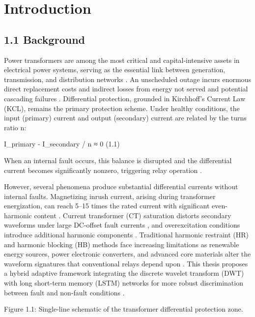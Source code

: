 \chapter{Introduction}
\label{ch:introduction}


\section{1.1  Background}
Power transformers are among the most critical and capital-intensive assets in electrical power systems, serving as the essential link between generation, transmission, and distribution networks \cite{ref1}. An unscheduled outage incurs enormous direct replacement costs and indirect losses from energy not served and potential cascading failures \cite{ref2}. Differential protection, grounded in Kirchhoff's Current Law (KCL), remains the primary protection scheme. Under healthy conditions, the input (primary) current and output (secondary) current are related by the turns ratio n:

I\_primary - I\_secondary / n ≈ 0	(1.1)

When an internal fault occurs, this balance is disrupted and the differential current becomes significantly nonzero, triggering relay operation \cite{ref3}.

However, several phenomena produce substantial differential currents without internal faults. Magnetizing inrush current, arising during transformer energization, can reach 5--15 times the rated current with significant even-harmonic content \cite{ref4}. Current transformer (CT) saturation distorts secondary waveforms under large DC-offset fault currents \cite{ref9}, and overexcitation conditions introduce additional harmonic components \cite{ref5}. Traditional harmonic restraint (HR) and harmonic blocking (HB) methods face increasing limitations as renewable energy sources, power electronic converters, and advanced core materials alter the waveform signatures that conventional relays depend upon \cite{ref5, ref6}. This thesis proposes a hybrid adaptive framework integrating the discrete wavelet transform (DWT) with long short-term memory (LSTM) networks for more robust discrimination between fault and non-fault conditions \cite{ref6, ref14}.

Figure 1.1: Single-line schematic of the transformer differential protection zone.



